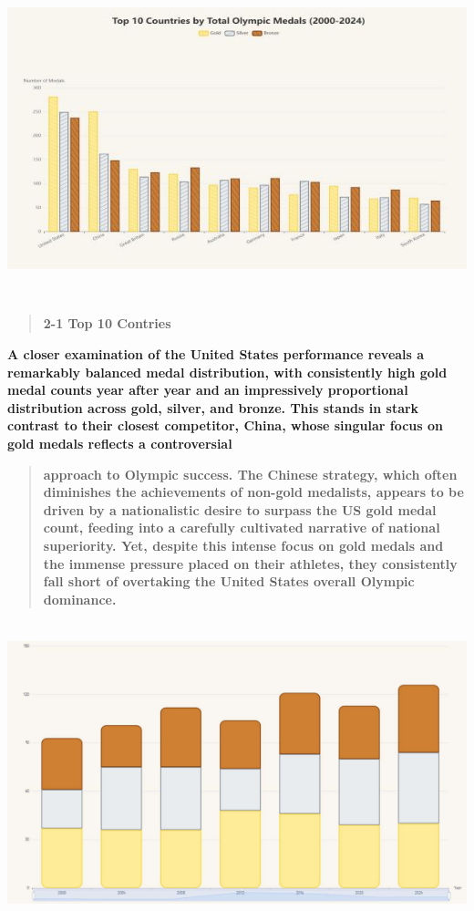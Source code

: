 \documentclass[12pt,a4paper]{article}
\renewenvironment{quote}{\begin{quotation}}{\end{quotation}}  %
\begin{document}
    \includegraphics[width=6.42in,height=3.655in]{./media/media/image3.jpeg}
    
    \begin{quote}
    \textbf{2-1 Top 10 Contries}
    \end{quote}
    
    \textbf{A closer examination of the United States\textquotesingle{}
    performance reveals a remarkably balanced medal distribution, with
    consistently high gold medal counts year after year and an impressively
    proportional distribution across gold, silver, and bronze. This stands
    in stark contrast to their closest competitor, China, whose singular
    focus on gold medals reflects a controversial}
    
    \begin{quote}
    \textbf{approach to Olympic success. The Chinese strategy, which often
    diminishes the achievements of non-gold medalists, appears to be driven
    by a nationalistic desire to surpass the US gold medal count, feeding
    into a carefully cultivated narrative of national superiority. Yet,
    despite this intense focus on gold medals and the immense pressure
    placed on their athletes, they consistently fall short of overtaking the
    United States\textquotesingle{} overall Olympic dominance.}
    \end{quote}
    
    \includegraphics[width=6.05167in,height=3.45in]{./media/media/image4.png}
    
\end{document}
